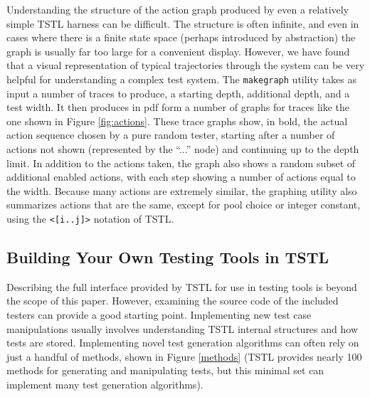 Understanding the structure of the action graph produced by even a relatively simple TSTL harness can be difficult.  The structure is often infinite, and even in cases where there is a finite state space (perhaps introduced by abstraction) the graph is usually far too large for a convenient display.  However, we have found that a visual representation of typical trajectories through the system can be very helpful for understanding a complex test system.  The {\tt makegraph} utility takes as input a number of traces to produce, a starting depth, additional depth, and a test width.  It then produces in pdf form a number of graphs for traces like the one shown in Figure \ref{fig:actions}.  These trace graphs show, in bold, the actual action sequence chosen by a pure random tester, starting after a number of actions not shown (represented by the ``...'' node) and continuing up to the depth limit.  In addition to the actions taken, the graph also shows a random subset of additional enabled actions, with each step showing a number of actions equal to the width.  Because many actions are extremely similar, the graphing utility also summarizes actions that are the same, except for pool choice or integer constant, using the {\tt <[i..j]>} notation of TSTL.

\subsection{Building Your Own Testing Tools in TSTL}
\label{sec:build}

Describing the full interface provided by TSTL for use in testing tools is beyond the scope of this paper.  However, examining the source code of the included testers can provide a good starting point.  Implementing new test case manipulations usually involves understanding TSTL internal structures and how tests are stored.  Implementing novel test generation algorithms can often rely on just a handful of methods, shown in Figure \ref{methods} (TSTL provides nearly 100 methods for generating and manipulating tests, but this minimal set can implement many test generation algorithms).

